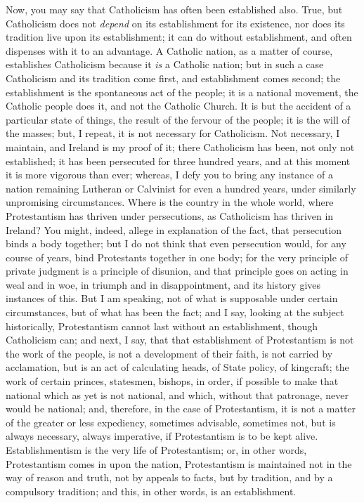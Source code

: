 Now, you may say that Catholicism has often been
established also. True, but Catholicism does not \emph{depend}
on its establishment for its existence, nor does its
tradition live upon its establishment; it can do without
establishment, and often dispenses with it to an
advantage. A Catholic nation, as a matter of course,
establishes Catholicism because it \emph{is} a Catholic
nation; but in such a case Catholicism and its tradition
come first, and establishment comes second; the
establishment is the spontaneous act of the people; it is
a national movement, the Catholic people does it, and not
the Catholic Church. It is but the accident of a
particular state of things, the result of the fervour of
the people; it is the will of the masses; but, I repeat,
it is not necessary for Catholicism. Not necessary, I
maintain, and Ireland is my proof of it; there
Catholicism has been, not only not established; it has
been persecuted for three hundred years, and at this
moment it is more vigorous than ever; whereas, I defy you
to bring any instance of a nation remaining Lutheran or
Calvinist for even a hundred years, under similarly
unpromising circumstances. Where is the country in the
whole world, where Protestantism has thriven under
persecutions, as Catholicism has thriven in Ireland? You
might, indeed, allege in explanation of the fact, that
persecution binds a body together; but I do not think
that even persecution would, for any course of years,
bind Protestants together in one body; for the very
principle of private judgment is a principle of disunion,
and that principle goes on acting in weal and in woe, in
triumph and in disappointment, and its history gives
instances of this. But I am speaking, not of what is
supposable under certain circumstances, but of what has
been the fact; and I say, looking at the subject
historically, Protestantism cannot last without an
establishment, though Catholicism can; and next, I say,
that that establishment of Protestantism is not the work
of the people, is not a development of their faith, is
not carried by acclamation, but is an act of calculating
heads, of State policy, of kingcraft; the work of certain
princes, statesmen, bishops, in order, if possible to
make that national which as yet is not national, and
which, without that patronage, never would be national;
and, therefore, in the case of Protestantism, it is not a
matter of the greater or less expediency, sometimes
advisable, sometimes not, but is always necessary, always
imperative, if Protestantism is to be kept alive.
Establishmentism is the very life of Protestantism; or,
in other words, Protestantism comes in upon the nation,
Protestantism is maintained not in the way of reason and
truth, not by appeals to facts, but by tradition, and by
a compulsory tradition; and this, in other words, is an
establishment.

